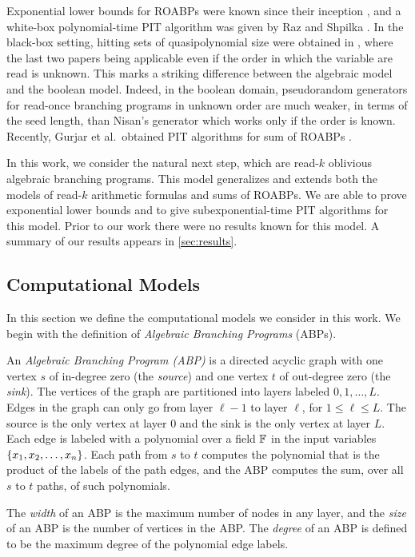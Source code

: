 \documentclass[11pt]{article}
\begin{document}
Exponential lower bounds for ROABPs were known since their inception \cite{nis91}, and a white-box polynomial-time PIT algorithm was given by Raz and Shpilka \cite{RS05}.
In the black-box setting, hitting sets of quasipolynomial size were obtained in \cite{FS13, FSS14, agks15}, where the last two papers being applicable even if the order in which the variable are read is unknown.
This marks a striking difference between the algebraic model and the boolean model.
Indeed, in the boolean domain, pseudorandom generators for read-once branching programs in unknown order are much weaker, in terms of the seed length, than Nisan's generator \cite{Nisan92} which works only if the order is known.
Recently, Gurjar et al.\ obtained PIT algorithms for sum of ROABPs \cite{GKST15}.


In this work, we consider the natural next step, which are read-$k$ oblivious algebraic branching programs.
This model generalizes and extends both the models of read-$k$ arithmetic formulas and sums of ROABPs.
We are able to prove exponential lower bounds and to give subexponential-time PIT algorithms for this model.
Prior to our work there were no results known for this model.
A summary of our results appears in \autoref{sec:results}.


\subsection{Computational Models}
\label{sec:models}
In this section we define the computational models we consider in this work.
We begin with the definition of {\em Algebraic Branching Programs} (ABPs).

\begin{definition}
\label{def:abp}
An {\em Algebraic Branching Program (ABP)} is a directed acyclic graph with one vertex $s$ of in-degree zero (the {\em source}) and one vertex $t$ of out-degree zero (the {\em sink}).
The vertices of the graph are partitioned into layers labeled $0, 1, \ldots, L$.
Edges in the graph can only go from layer $\ell-1$ to layer $\ell$, for $1 \le \ell \le L$.
The source is the only vertex at layer $0$ and the sink is the only vertex at layer $L$.
Each edge is labeled with a polynomial over a field $\F$ in the input variables $\left\{ x_1,x_2,\ldots,x_n \right\}$.
Each path from $s$ to $t$ computes the polynomial that is the product of the labels of the path edges, and the ABP computes the sum, over all $s$ to $t$ paths, of such polynomials.

The {\em width} of an ABP is the maximum number of nodes in any layer, and the {\em size} of an ABP is the number of vertices in the ABP.
The {\em degree} of an ABP is defined to be the maximum degree of the polynomial edge labels.	
\end{definition}
\end{document}
